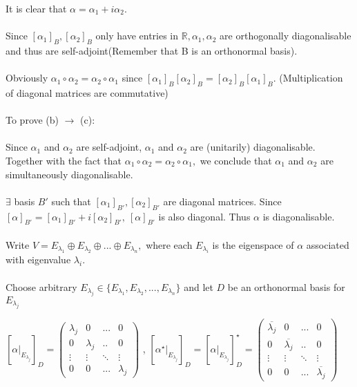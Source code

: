 \documentclass{article}
\begin{document}
It is clear that $\alpha = \alpha_1 + i\alpha_2$.\\\\ Since $[\alpha_1]_B,[\alpha_2]_B$ only have entries in $\mathbb{R}, \alpha_1,\alpha_2$ are orthogonally diagonalisable and thus are self-adjoint(Remember that B is an orthonormal basis).\\\\ Obviously $\alpha_1\circ\alpha_2 = \alpha_2\circ\alpha_1$ since $[\alpha_1]_B[\alpha_2]_B = [\alpha_2]_B[\alpha_1]_B$. (Multiplication of diagonal matrices are commutative)\\\\
To prove (b) $\to$ (c):\\\\
Since $\alpha_1$ and $\alpha_2$ are self-adjoint, $\alpha_1$ and $\alpha_2$ are (unitarily) diagonalisable.\\ Together with the fact that $\alpha_1 \circ \alpha_2 = \alpha_2 \circ \alpha_1,$ we conclude that $\alpha_1$ and $\alpha_2$ are simultaneously diagonalisable. \\\\
$\exists $ basis $B'$ such that $[\alpha_1]_{B'},[\alpha_2]_{B'}$ are diagonal matrices. Since\\ $[\alpha]_{B'} = [\alpha_1]_{B'} + i[\alpha_2]_{B'},\ [\alpha]_{B'}$ is also diagonal. Thus $\alpha$ is diagonalisable.\\\\
Write $V = E_{\lambda_1} \oplus E_{\lambda_2} \oplus ... \oplus E_{\lambda_n}, $ where each $E_{\lambda_i}$ is the eigenspace of $\alpha$ associated with eigenvalue $\lambda_i$.\\\\
Choose arbitrary $E_{\lambda_j}\in \{E_{\lambda_1},E_{\lambda_2},...,E_{\lambda_n}\}$ and let $D$ be an orthonormal basis for $E_{\lambda_j}$\begin{center} $[\alpha|_{E_{\lambda_j}}]_{D} = \begin{pmatrix} \lambda_j & 0 & ... & 0 \\
0 & \lambda_j & .. & 0\\
\vdots & \vdots & \ddots & \vdots \\
0 & 0 & ... & \lambda_j
\end{pmatrix}$ , $[\alpha^\star|_{E_{\lambda_j}}]_{D} = [\alpha|_{E_{\lambda_j}}]_{D}^\star = \begin{pmatrix} \overline{\lambda_j} & 0 & ... & 0 \\
0 & \overline{\lambda_j} & .. & 0\\
\vdots & \vdots & \ddots & \vdots \\
0 & 0 & ... & \overline{\lambda_j}
\end{pmatrix}$
\end{center}
\end{document}
